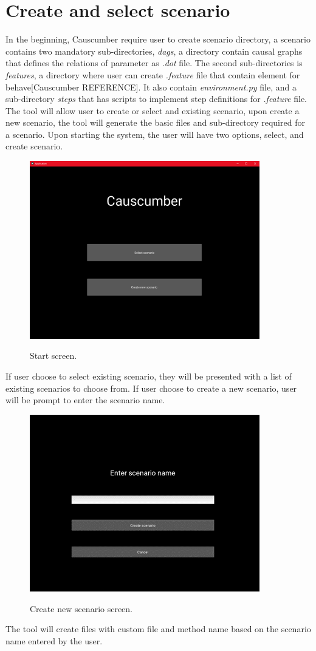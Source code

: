 \section{Create and select scenario}
In the beginning, Causcumber require user to create scenario directory, a scenario contains two mandatory sub-directories, \textsl{dags}, a directory contain causal graphs that defines the relations of parameter as \textsl{.dot} file. The second sub-directories is \textsl{features}, a directory where user can create \textsl{.feature} file that contain element for behave[Causcumber REFERENCE]. It also contain \textsl{environment.py} file, and a sub-directory \textsl{steps} that has scripts to implement step definitions for \textsl{.feature} file. The tool will allow user to create or select and existing scenario, upon create a new scenario, the tool will generate the basic files and sub-directory required for a scenario. Upon starting the system, the user will have two options, select, and create scenario.
\begin{figure}[H]
	\centering
	\includegraphics[width=10cm]{figures/startScreen.png}\\
	\caption{Start screen.}
	\label{fig:figure10}
\end{figure}
If user choose to select existing scenario, they will be presented with a list of existing scenarios to choose from. If user choose to create a new scenario, user will be prompt to enter the scenario name.
\begin{figure}[H]
	\centering
	\includegraphics[width=10cm]{figures/createNewScenario.png}\\
	\caption{Create new scenario screen.}
	\label{fig:figure11}
\end{figure}
The tool will create files with custom file and method name based on the scenario name entered by the user.

